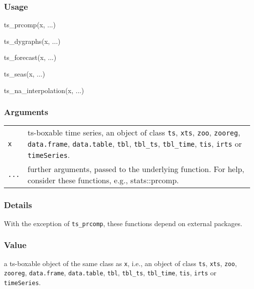 \documentclass[
  letterpaper,
  DIV=11,
  numbers=noendperiod]{scrreport}
\newenvironment{Shaded}{\begin{snugshade}}{\end{snugshade}}
\newcommand{\FunctionTok}[1]{\textcolor[rgb]{0.28,0.35,0.67}{#1}}
\newcommand{\NormalTok}[1]{\textcolor[rgb]{0.00,0.23,0.31}{#1}}
\begin{document}
\subsubsection{Usage}\label{usage-83}

\begin{Shaded}
\begin{Highlighting}[]
\FunctionTok{ts\_prcomp}\NormalTok{(x, ...)}

\FunctionTok{ts\_dygraphs}\NormalTok{(x, ...)}

\FunctionTok{ts\_forecast}\NormalTok{(x, ...)}

\FunctionTok{ts\_seas}\NormalTok{(x, ...)}

\FunctionTok{ts\_na\_interpolation}\NormalTok{(x, ...)}
\end{Highlighting}
\end{Shaded}

\subsubsection{Arguments}\label{arguments-83}

\begin{longtable}[]{@{}ll@{}}
\toprule\noalign{}
\endhead
\bottomrule\noalign{}
\endlastfoot
\texttt{x} & ts-boxable time series, an object of class \texttt{ts},
\texttt{xts}, \texttt{zoo}, \texttt{zooreg}, \texttt{data.frame},
\texttt{data.table}, \texttt{tbl}, \texttt{tbl\_ts}, \texttt{tbl\_time},
\texttt{tis}, \texttt{irts} or \texttt{timeSeries}. \\
\texttt{...} & further arguments, passed to the underlying function. For
help, consider these functions, e.g., stats::prcomp. \\
\end{longtable}

\subsubsection{Details}\label{details-21}

With the exception of \texttt{ts\_prcomp}, these functions depend on
external packages.

\subsubsection{Value}\label{value-70}

a ts-boxable object of the same class as \texttt{x}, i.e., an object of
class \texttt{ts}, \texttt{xts}, \texttt{zoo}, \texttt{zooreg},
\texttt{data.frame}, \texttt{data.table}, \texttt{tbl},
\texttt{tbl\_ts}, \texttt{tbl\_time}, \texttt{tis}, \texttt{irts} or
\texttt{timeSeries}.
\end{document}
